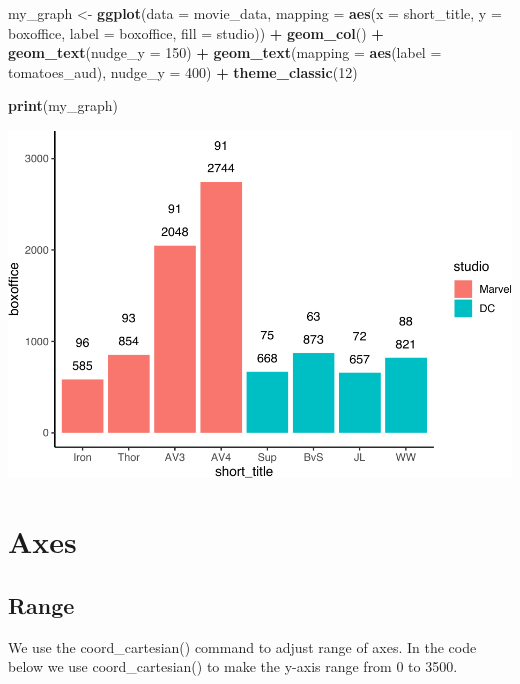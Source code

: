 \documentclass[
]{krantz}
\makeatletter
\newenvironment{Shaded}{\begin{snugshade}}{\end{snugshade}}
\newcommand{\DataTypeTok}[1]{\textcolor[rgb]{0.27,0.27,0.27}{#1}}
\newcommand{\DecValTok}[1]{\textcolor[rgb]{0.06,0.06,0.06}{#1}}
\newcommand{\KeywordTok}[1]{\textcolor[rgb]{0.27,0.27,0.27}{\textbf{#1}}}
\newcommand{\NormalTok}[1]{#1}
\newcommand{\OperatorTok}[1]{\textcolor[rgb]{0.43,0.43,0.43}{\textbf{#1}}}
\newcommand{\StringTok}[1]{\textcolor[rgb]{0.5,0.5,0.5}{#1}}
\newenvironment{kframe}{%
\medskip{}
\setlength{\fboxsep}{.8em}
 \def\at@end@of@kframe{}%
 \ifinner\ifhmode%
  \def\at@end@of@kframe{\end{minipage}}%
  \begin{minipage}{\columnwidth}%
 \fi\fi%
 \def\FrameCommand##1{\hskip\@totalleftmargin \hskip-\fboxsep
 \colorbox{shadecolor}{##1}\hskip-\fboxsep
     \hskip-\linewidth \hskip-\@totalleftmargin \hskip\columnwidth}%
 \MakeFramed {\advance\hsize-\width
   \@totalleftmargin\z@ \linewidth\hsize
   \@setminipage}}%
 {\par\unskip\endMakeFramed%
 \at@end@of@kframe}
\renewenvironment{Shaded}{\begin{kframe}}{\end{kframe}}
\makeatother
\begin{document}
\begin{Shaded}
\begin{Highlighting}[]
\NormalTok{my_graph <-}\StringTok{ }\KeywordTok{ggplot}\NormalTok{(}\DataTypeTok{data =}\NormalTok{ movie_data,}
           \DataTypeTok{mapping =} \KeywordTok{aes}\NormalTok{(}\DataTypeTok{x =}\NormalTok{ short_title,}
                         \DataTypeTok{y =}\NormalTok{ boxoffice,}
                         \DataTypeTok{label =}\NormalTok{ boxoffice, }
                         \DataTypeTok{fill =}\NormalTok{ studio)) }\OperatorTok{+}
\StringTok{  }\KeywordTok{geom_col}\NormalTok{() }\OperatorTok{+}
\StringTok{  }\KeywordTok{geom_text}\NormalTok{(}\DataTypeTok{nudge_y =} \DecValTok{150}\NormalTok{)  }\OperatorTok{+}
\StringTok{  }\KeywordTok{geom_text}\NormalTok{(}\DataTypeTok{mapping =} \KeywordTok{aes}\NormalTok{(}\DataTypeTok{label =}\NormalTok{ tomatoes_aud), }
            \DataTypeTok{nudge_y =} \DecValTok{400}\NormalTok{) }\OperatorTok{+}
\StringTok{  }\KeywordTok{theme_classic}\NormalTok{(}\DecValTok{12}\NormalTok{)}

\KeywordTok{print}\NormalTok{(my_graph)}
\end{Highlighting}
\end{Shaded}

\includegraphics[width=0.65\linewidth]{bookdown_files/figure-latex/unnamed-chunk-268-1}

\hypertarget{axes}{%
\section{Axes}\label{axes}}

\hypertarget{range}{%
\subsection{Range}\label{range}}

We use the coord\_cartesian() command to adjust range of axes. In the code below we use coord\_cartesian() to make the y-axis range from 0 to 3500.
\end{document}
